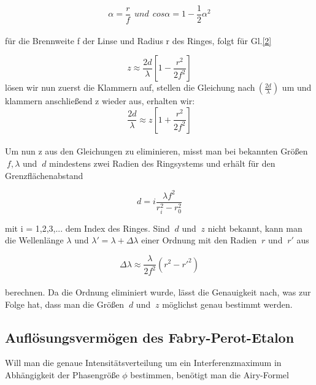 \documentclass{article}
\begin{document}
\begin{equation}
\label{6}
\alpha = \frac {r}{f} \ \ und \ \ cos \alpha = 1- \frac {1}{2} \alpha ^2
\end{equation}\\

für die Brennweite f der Linse und Radius r des Ringes, folgt für Gl.\eqref{2}

\begin{equation}
\label{7}
z \approx \frac {2d}{\lambda} \left [ 1-\frac {r^2}{2f^2} \right ]
\end{equation}
lösen wir nun zuerst die Klammern auf, stellen die Gleichung nach\(\ \left(\frac{2d}{\lambda }\right)\) um und klammern anschließend z wieder aus, erhalten wir:
\begin{equation}
\frac {2d}{\lambda} \approx z \left [1+ \frac {r^2}{2f^2} \right ]
\end{equation}\\

Um nun z aus den Gleichungen zu eliminieren, misst man bei bekannten Größen \(\ f, \lambda \) und \(\ d \) mindestens zwei Radien des Ringsystems und erhält für den Grenzflächenabstand

\begin{equation}
\label{8}
d = i \frac {\lambda f^2}{r_{i}^2 - r_{0}^2}
\end{equation}

mit i = 1,2,3,... dem Index des Ringes.
Sind \(\ d \) und \(\ z \) nicht bekannt, kann man die Wellenlänge \(\lambda \) und \(\lambda ' = \lambda + \Delta \lambda \) einer Ordnung mit den Radien \(\ r \) und \(\ r' \) aus

\begin{equation}
\label{9}
\Delta \lambda \approx \frac {\lambda}{2f^2} (r^2 - r'^2)
\end{equation}\\

berechnen. Da die Ordnung eliminiert wurde, lässt die Genauigkeit nach, was zur Folge hat, dass man die Größen \(\ d \) und \(\ z \) möglichst genau bestimmt werden.\\

\subsection{Auflösungsvermögen des Fabry-Perot-Etalon} 
Will man die genaue Intensitätsverteilung um ein Interferenzmaximum in Abhängigkeit der Phasengröße \(\phi \) bestimmen, benötigt man die {\sc Airy-Formel}
\end{document}
